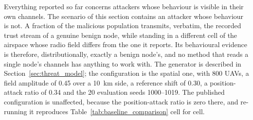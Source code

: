 \documentclass[notspecified,article,submit,moreauthors]{Definitions/mdpi}
\begin{document}
Everything reported so far concerns attackers whose behaviour is visible in their own channels. The scenario of this section contains an attacker whose behaviour is not. A fraction of the malicious population transmits, verbatim, the recorded trust stream of a genuine benign node, while standing in a different cell of the airspace whose radio field differs from the one it reports. Its behavioural evidence is therefore, distributionally, exactly a benign node's, and no method that reads a single node's channels has anything to work with. The generator is described in Section~\ref{sec:threat_model}; the configuration is the spatial one, with 800 UAVs, a field amplitude of 0.45 over a 10~km side, a reference shift of 0.30, a position-attack ratio of 0.34 and the 20 evaluation seeds 1000--1019. The published configuration is unaffected, because the position-attack ratio is zero there, and re-running it reproduces Table~\ref{tab:baseline_comparison} cell for cell.
\end{document}
